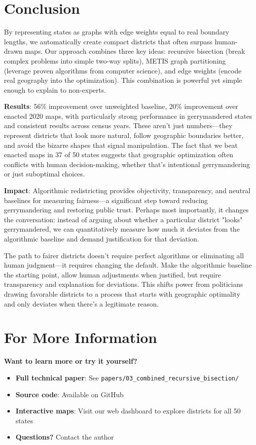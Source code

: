 \documentclass[11pt]{article}
\begin{document}
\section{Conclusion}

By representing states as graphs with edge weights equal to real boundary lengths, we automatically create compact districts that often surpass human-drawn maps. Our approach combines three key ideas: recursive bisection (break complex problems into simple two-way splits), METIS graph partitioning (leverage proven algorithms from computer science), and edge weights (encode real geography into the optimization). This combination is powerful yet simple enough to explain to non-experts.

\textbf{Results}: 56\% improvement over unweighted baseline, 20\% improvement over enacted 2020 maps, with particularly strong performance in gerrymandered states and consistent results across census years. These aren't just numbers—they represent districts that look more natural, follow geographic boundaries better, and avoid the bizarre shapes that signal manipulation. The fact that we beat enacted maps in 37 of 50 states suggests that geographic optimization often conflicts with human decision-making, whether that's intentional gerrymandering or just suboptimal choices.

\textbf{Impact}: Algorithmic redistricting provides objectivity, transparency, and neutral baselines for measuring fairness—a significant step toward reducing gerrymandering and restoring public trust. Perhaps most importantly, it changes the conversation: instead of arguing about whether a particular district "looks" gerrymandered, we can quantitatively measure how much it deviates from the algorithmic baseline and demand justification for that deviation.

The path to fairer districts doesn't require perfect algorithms or eliminating all human judgment—it requires changing the default. Make the algorithmic baseline the starting point, allow human adjustments when justified, but require transparency and explanation for deviations. This shifts power from politicians drawing favorable districts to a process that starts with geographic optimality and only deviates when there's a legitimate reason.

\section*{For More Information}

\textbf{Want to learn more or try it yourself?}
\begin{itemize}
\item \textbf{Full technical paper}: See \texttt{papers/03\_combined\_recursive\_bisection/}
\item \textbf{Source code}: Available on GitHub
\item \textbf{Interactive maps}: Visit our web dashboard to explore districts for all 50 states
\item \textbf{Questions?} Contact the author
\end{itemize}
\end{document}
